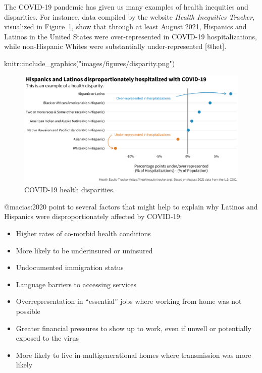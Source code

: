 \documentclass[
  letterpaper,
  DIV=11,
  numbers=noendperiod,
  oneside]{scrartcl}
\newenvironment{Shaded}{\begin{snugshade}}{\end{snugshade}}
\newcommand{\FunctionTok}[1]{\textcolor[rgb]{0.28,0.35,0.67}{#1}}
\newcommand{\NormalTok}[1]{\textcolor[rgb]{0.00,0.23,0.31}{#1}}
\newcommand{\SpecialCharTok}[1]{\textcolor[rgb]{0.37,0.37,0.37}{#1}}
\newcommand{\StringTok}[1]{\textcolor[rgb]{0.13,0.47,0.30}{#1}}
\providecommand{\tightlist}{%
  \setlength{\itemsep}{0pt}\setlength{\parskip}{0pt}}\usepackage{longtable,booktabs,array}
\begin{document}
The COVID-19 pandemic has given us many examples of health inequities
and disparities. For instance, data compiled by the website \emph{Health
Inequities Tracker}, visualized in Figure~\ref{fig-disparity}, show that
through at least August 2021, Hispanics and Latinos in the United States
were over-represented in COVID-19 hospitalizations, while non-Hispanic
Whites were substantially under-represented {[}@het{]}.

\begin{Shaded}
\begin{Highlighting}[]
\NormalTok{knitr}\SpecialCharTok{::}\FunctionTok{include\_graphics}\NormalTok{(}\StringTok{"images/figures/disparity.png"}\NormalTok{) }
\end{Highlighting}
\end{Shaded}

\begin{figure}[H]

{\centering \includegraphics{images/figures/disparity.png}

}

\caption{\label{fig-disparity}COVID-19 health disparities.}

\end{figure}

@macias:2020 point to several factors that might help to explain why
Latinos and Hispanics were disproportionately affected by COVID-19:

\begin{itemize}
\tightlist
\item
  Higher rates of co-morbid health conditions
\item
  More likely to be underinsured or uninsured
\item
  Undocumented immigration status
\item
  Language barriers to accessing services
\item
  Overrepresentation in ``essential'' jobs where working from home was
  not possible
\item
  Greater financial pressures to show up to work, even if unwell or
  potentially exposed to the virus
\item
  More likely to live in multigenerational homes where transmission was
  more likely
\end{itemize}
\end{document}
